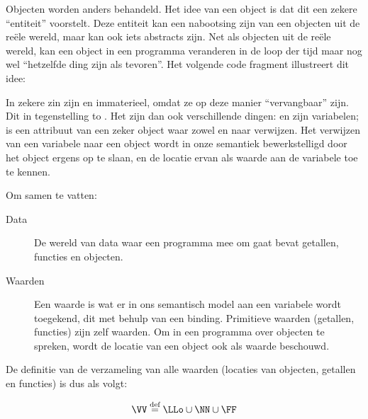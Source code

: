 Objecten worden anders behandeld. Het idee van een object is dat dit een zekere ``entiteit'' voorstelt. Deze entiteit kan een nabootsing zijn van een objecten uit de reële wereld, maar kan ook iets abstracts zijn. Net als objecten uit de reële wereld, kan een object in een programma veranderen in de loop der tijd maar nog wel ``hetzelfde ding zijn als tevoren''. Het volgende code fragment illustreert dit idee:

\begin{NoBreak}
  \codeFragmentCaption
\end{NoBreak}

In zekere zin zijn  en  immaterieel, omdat ze op deze manier ``vervangbaar'' zijn. Dit in tegenstelling to . Het zijn dan ook verschillende dingen:  en  zijn variabelen;  is een attribuut van een zeker object waar zowel  en  naar verwijzen.
Het verwijzen van een variabele naar een object wordt in onze semantiek bewerkstelligd door het object ergens op te slaan, en de locatie ervan als waarde aan de variabele toe te kennen.

Om samen te vatten:
\begin{description}
  \item[Data] De wereld van data waar een programma mee om gaat bevat getallen, functies en objecten.
  \item[Waarden] Een waarde is wat er in ons semantisch model aan een variabele wordt toegekend, dit met behulp van een binding. Primitieve waarden (getallen, functies) zijn zelf waarden. Om in een programma over objecten te spreken, wordt de locatie van een object ook als waarde beschouwd.
\end{description}

De definitie van de verzameling van alle waarden (locaties van objecten, getallen en functies) is dus als volgt:

\begin{equation*}
  \VV \DEF \LLo \cup \NN \cup \FF
\end{equation*}

